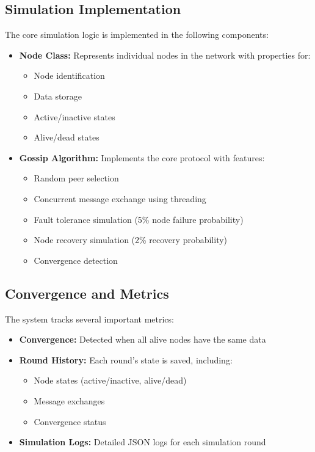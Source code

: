 \documentclass[a4paper,12pt]{article}
\begin{document}
\subsection{Simulation Implementation}
The core simulation logic is implemented in the following components:
\begin{itemize}
    \item \textbf{Node Class:} Represents individual nodes in the network with properties for:
        \begin{itemize}
            \item Node identification
            \item Data storage
            \item Active/inactive states
            \item Alive/dead states
        \end{itemize}
    \item \textbf{Gossip Algorithm:} Implements the core protocol with features:
        \begin{itemize}
            \item Random peer selection
            \item Concurrent message exchange using threading
            \item Fault tolerance simulation (5\% node failure probability)
            \item Node recovery simulation (2\% recovery probability)
            \item Convergence detection
        \end{itemize}
\end{itemize}

\subsection{Convergence and Metrics}
The system tracks several important metrics:
\begin{itemize}
    \item \textbf{Convergence:} Detected when all alive nodes have the same data
    \item \textbf{Round History:} Each round's state is saved, including:
        \begin{itemize}
            \item Node states (active/inactive, alive/dead)
            \item Message exchanges
            \item Convergence status
        \end{itemize}
    \item \textbf{Simulation Logs:} Detailed JSON logs for each simulation round
\end{itemize}
\end{document}
